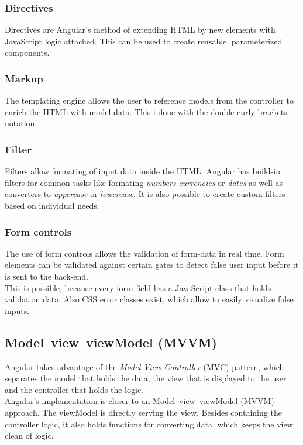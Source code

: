 \subsubsection{Directives}
Directives are Angular's method of extending HTML by new elements with JavaScript logic attached. This can be used to create reusable, parameterized components.

\subsubsection{Markup}
The templating engine allows the user to reference models from the controller to enrich the HTML with model data. This i done with the double curly brackets notation.

\subsubsection{Filter}
Filters allow formating of input data inside the HTML. Angular has build-in filters for common tasks like formating \textit{numbers} \textit{currencies} or \textit{dates} as well as converters to \textit{uppercase} or \textit{lowercase}. It is also possible to create custom filters based on individual needs.

\subsubsection{Form controls}
The use of form controls allows the validation of form-data in real time. Form elements can be validated against certain gates to detect false user input before it is sent to the back-end.\\
This is possible, because every form field has a JavaScript class that holds validation data. Also CSS error classes exist, which allow to easily visualize false inputs.


\subsection{Model–view–viewModel (MVVM)}
Angular takes advantage of the \textit{Model View Controller} (MVC) pattern, which separates the model that holds the data, the view that is displayed to the user and the controller that holds the logic.\\
Angular's implementation is closer to an Model–view–viewModel (MVVM) approach. The viewModel is directly serving the view. Besides containing the controller logic, it also holds functions for converting data, which keeps the view clean of logic.


